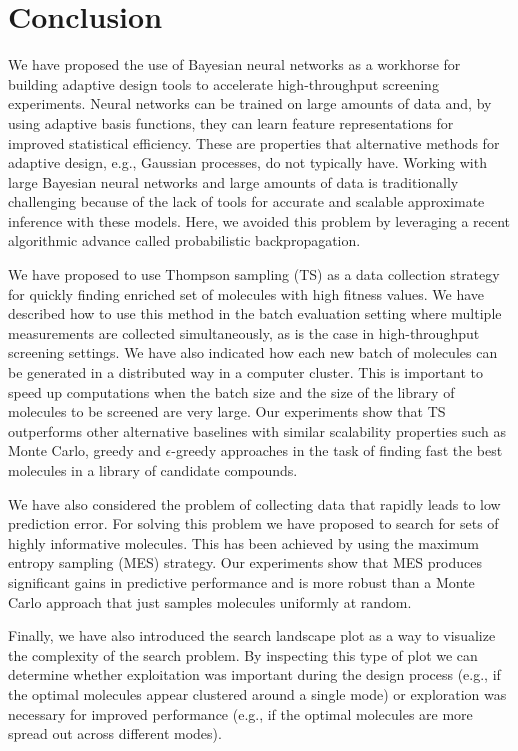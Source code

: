 \section{Conclusion}

We have proposed the use of Bayesian neural networks as a workhorse for building adaptive design tools to accelerate high-throughput screening experiments. Neural networks can be trained on large amounts of data and, by using adaptive basis functions, they can learn feature representations for improved statistical efficiency. These are properties that alternative methods for adaptive design, e.g., Gaussian processes, do not typically have. Working with large Bayesian neural networks and large amounts of data is traditionally challenging because of the lack of tools for accurate and scalable approximate inference with these models. Here, we avoided this problem by leveraging a recent algorithmic advance called probabilistic backpropagation.

We have proposed to use Thompson sampling (TS) as a data collection strategy for quickly finding enriched set of molecules with high fitness values. We have described how to use this method in the batch evaluation setting where multiple measurements are collected simultaneously, as is the case in high-throughput screening settings. We have also indicated how each new batch of molecules can be generated in a distributed way in a computer cluster. This is important to speed up computations when the batch size and the size of the library of molecules to be screened are very large. Our experiments show that TS outperforms other alternative baselines with similar scalability properties such as Monte Carlo, greedy and $\epsilon$-greedy approaches in the task of finding fast the best molecules in a library of candidate compounds.

We have also considered the problem of collecting data that rapidly leads to low prediction error. For solving this problem we have proposed to search for sets of highly informative molecules. This has been achieved by using the maximum entropy sampling (MES) strategy. Our experiments show that MES produces significant gains in predictive performance and is more robust than a Monte Carlo approach that just samples molecules uniformly at random.

Finally, we have also introduced the search landscape plot as a way to visualize the complexity of the search problem. By inspecting this type of plot we can determine whether exploitation was important during the design process (e.g., if the optimal molecules appear clustered around a single mode) or exploration was necessary for improved performance (e.g., if the optimal molecules are more spread out across different modes).